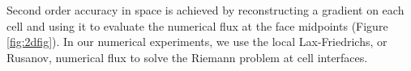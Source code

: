 Second order accuracy in space is achieved by reconstructing a gradient on each cell and using it to evaluate the numerical flux at the face midpoints (Figure \ref{fig:2dfig}).  
In our numerical experiments, we use the local Lax-Friedrichs, or Rusanov, numerical flux to solve the Riemann problem at cell interfaces.

